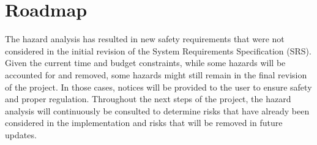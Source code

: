 \documentclass{article}
\begin{document}
\section{Roadmap}
The hazard analysis has resulted in new safety requirements that were not considered in the initial revision of the 
System Requirements Specification (SRS). Given the current time and budget constraints, while some hazards will be accounted 
for and removed, some hazards might still remain in the final revision of the project. In those cases, notices will be provided 
to the user to ensure safety and proper regulation. Throughout the next steps of the project, the hazard analysis will continuously 
be consulted to determine risks that have already been considered in the implementation and risks that will be removed in future updates.
\end{document}
